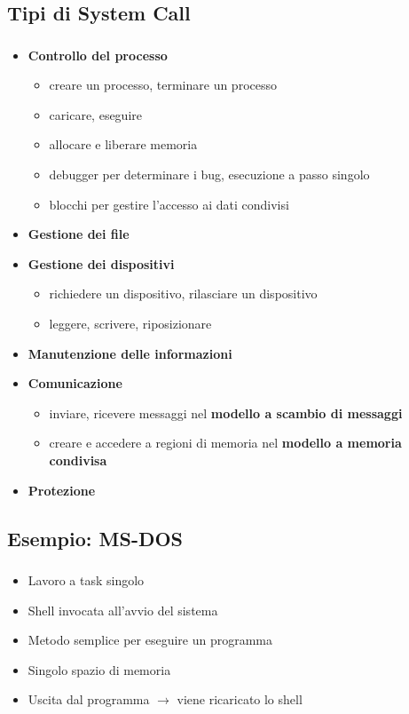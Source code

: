 \documentclass{beamer}
\newenvironment{mainframe}{
	\begin{frame}
		\frametitle{\insertsubsection}
		\framesubtitle{\insertsection}
	}{
	\end{frame}
}
\begin{document}
\subsection{Tipi di System Call}
\begin{mainframe}
	\begin{multicols}{2}
	\begin{itemize}
		\item \textbf{Controllo del processo}
	\begin{itemize}
		\item creare un processo, terminare un processo
		\item caricare, eseguire
		\item allocare e liberare memoria
		\item debugger per determinare i bug, esecuzione a passo singolo
		\item blocchi per gestire l'accesso ai dati condivisi
	\end{itemize}
	\item \textbf{Gestione dei file}
	\item \textbf{Gestione dei dispositivi}
	\begin{itemize}
		\item richiedere un dispositivo, rilasciare un dispositivo
		\item leggere, scrivere, riposizionare
	\end{itemize}
	\item \textbf{Manutenzione delle informazioni}
	\item \textbf{Comunicazione}
	\begin{itemize}
		\item inviare, ricevere messaggi nel \textbf{modello a scambio di messaggi}
		\item creare e accedere a regioni di memoria nel \textbf{modello a memoria condivisa}
	\end{itemize}
	\item \textbf{Protezione}
\end{itemize}
		\end{multicols}
\end{mainframe}
\subsection{Esempio: MS-DOS}
\begin{mainframe}
	\begin{itemize}
		\item Lavoro a task singolo
		\item Shell invocata all'avvio del sistema
		\item Metodo semplice per eseguire un programma
		\item Singolo spazio di memoria
		\item Uscita dal programma $\rightarrow$ viene ricaricato lo shell
	\end{itemize}
\end{mainframe}
\end{document}
